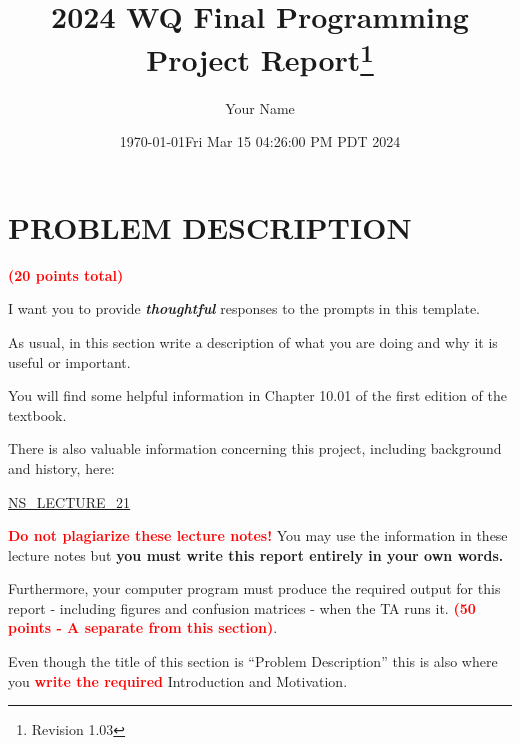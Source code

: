 \documentclass[dvipsnames,12pt]{article} %
\title{2024 WQ Final Programming Project Report\footnote{Revision 1.03}}
\author{Your Name} %
\date{\today}
\date{Fri Mar 15 04:26:00 PM PDT 2024}
\newcommand{\Brd}[1]{{\textbf{\textcolor{Red}{#1}}}}               %
\newcommand{\Brp}[1]{\textbf{\textcolor{RoyalPurple}{#1}}}         %
\begin{document}
\maketitle
\tableofcontents
\newpage

  \section{PROBLEM DESCRIPTION}
    \label{SECT 01:PROBLEM DESCRIPTION}
    
      \Brd{(20 points total)}

      \vspace{06pt}

      I want you to provide \textbf{\textit{thoughtful}} responses to the prompts in this template.

      \vspace{06pt}

      As usual, in this section write a description of what you are doing and why it is useful or
      important.

      \vspace{06pt}

      You will find some helpful information in Chapter 10.01 of the first edition of the textbook.

      \vspace{06pt}

      There is also valuable information concerning this project, including background and history,
      here:
      \vspace{-02pt}
      \begin{center}
        \href{https://canvas.ucdavis.edu/files/23522088/download?download_frd=1}{NS\_LECTURE\_21}
      \end{center}
      \Brd{Do not plagiarize these lecture notes!} You may use the information in these lecture
      notes but \Brp{you must write this report entirely in your own words.}

      \vspace{06pt}

      Furthermore, your computer program must produce the required output for this report -
      including figures and confusion matrices - when the TA runs it.
      \Brd{(50 points - A separate from this section)}.

      \vspace{06pt}

      Even though the title of this section is ``Problem Description'' this is also where you
      \Brd{write the required} Introduction and Motivation.
\end{document}

